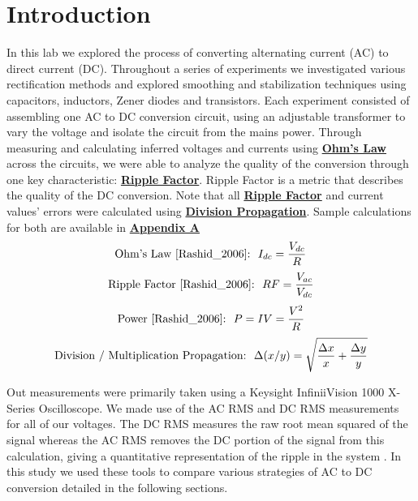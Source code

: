 \documentclass[
	letterpaper
	12pt
]{template}
\newcommand{\bref}[2]{\textbf{\hyperref[#1]{#2}}}
\begin{document}
\section{Introduction}
In this lab we explored the process of converting alternating current (AC) to direct current (DC). Throughout a series of experiments we investigated various rectification methods and explored smoothing and stabilization techniques using capacitors, inductors, Zener diodes and transistors. Each experiment consisted of assembling one AC to DC conversion circuit, using an adjustable transformer to vary the voltage and isolate the circuit from the mains power. Through measuring and calculating inferred voltages and currents using \bref{eqn::ohm}{Ohm's Law} across the circuits, we were able to analyze the quality of the conversion through one key characteristic: \bref{eqn::ripple}{Ripple Factor}. Ripple Factor is a metric that describes the quality of the DC conversion. Note that all \bref{eqn::ripple}{Ripple Factor} and current values' errors were calculated using \bref{prop::div}{Division Propagation}. Sample calculations for both are available in \bref{appdx::A}{Appendix A}
\begin{equation}\label{eqn::ohm}
	\text{Ohm's Law \cite{Rashid_2006}:}\ \ I_{dc}={V_{dc}\over R}
\end{equation}
\begin{equation}\label{eqn::ripple}
	\text{Ripple Factor \cite{Rashid_2006}:} \ \ RF = {V_{ac}\over V_{dc}}
\end{equation}
\begin{equation}\label{eqn::power}
	\text{Power \cite{Rashid_2006}:}\ \  P = IV = {V^2\over R}
\end{equation}
\begin{equation}\label{prop::div}
	\text{Division / Multiplication Propagation:}\ \ \Delta ({x/ y}) = \sqrt{{\Delta x\over x} + {\Delta y\over  y}}
\end{equation}

Out measurements were primarily taken using a Keysight InfiniiVision 1000 X-Series Oscilloscope. We made use of the AC RMS and DC RMS measurements for all of our voltages. The DC RMS measures the raw root mean squared of the signal whereas the AC RMS removes the DC portion of the signal from this calculation, giving a quantitative representation of the ripple in the system \cite{RMS}. In this study we used these tools to compare various strategies of AC to DC conversion detailed in the following sections.
\end{document}
